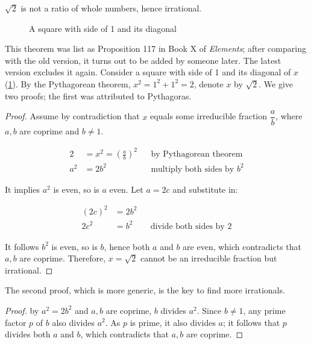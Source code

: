 \documentclass[b5paper]{article}
\begin{document}
\begin{theorem}[Pythagoras]
$\sqrt{2}$ is not a ratio of whole numbers, hence irrational.
\end{theorem}

\begin{figure}[htbp]
  \centering
  \caption{A square with side of 1 and its diagonal}
  \label{fig:square-diagonal}
\end{figure}

This theorem was list as Proposition 117 in Book X of \emph{Elements}; after comparing with the old version, it turns out to be added by someone later. The latest version excludes it again. Consider a square with side of 1 and its diagonal of $x$ (\cref{fig:square-diagonal}). By the Pythagorean theorem, $x^2 = 1^2 + 1^2 = 2$, denote $x$ by $\sqrt{2}$. We give two proofs; the first was attributed to Pythagoras.

\begin{proof}
Assume by contradiction that $x$ equals some irreducible fraction $\dfrac{a}{b}$, where $a, b$ are coprime and $b \ne 1$.

\begin{align*}
2 &= x^2 = (\frac{a}{b})^2  && \text{by Pythagorean theorem} \\
a^2 &= 2b^2  && \text{multiply both sides by }b^2
\end{align*}

It implies $a^2$ is even, so is $a$ even. Let $a = 2c$ and substitute in:

\begin{align*}
(2c)^2 &= 2b^2 \\
2c^2 &= b^2 && \text{divide both sides by }2
\end{align*}

It follows $b^2$ is even, so is $b$, hence both $a$ and $b$ are even, which contradicts that  $a, b$ are coprime. Therefore, $x = \sqrt{2}$ cannot be an irreducible fraction but irrational.
\end{proof}

The second proof, which is more generic, is the key to find more irrationals.
\begin{proof}
by $a^2 = 2b^2$ and $a, b$ are coprime, $b$ divides $a^2$. Since $b \ne 1$, any prime factor $p$ of $b$ also divides $a^2$. As $p$ is prime, it also divides $a$; it follows that $p$ divides both $a$ and $b$, which contradicts that $a, b$ are coprime.
\end{proof}
\end{document}
